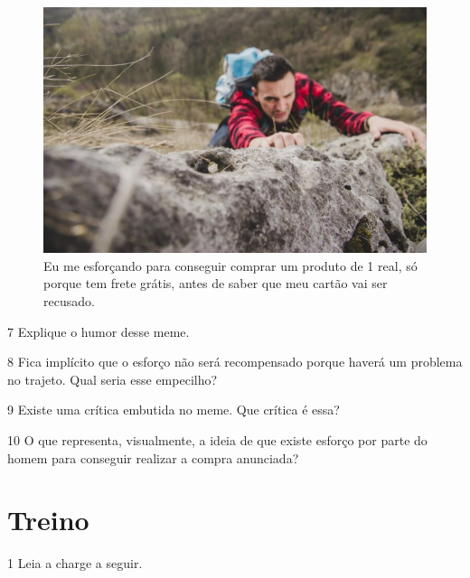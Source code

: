 \begin{figure}[htpb!]
\centering
\includegraphics[width=.8\textwidth]{./media/img5pt.png}
\caption{Eu me esforçando para conseguir comprar um produto de 1 real, só porque
tem frete grátis, antes de saber que meu cartão vai ser recusado.}
\end{figure}

\num{7} Explique o humor desse meme.


\num{8} Fica implícito que o esforço não será recompensado porque haverá um
  problema no trajeto. Qual seria esse empecilho?


\num{9} Existe uma crítica embutida no meme. Que crítica é essa?


\num{10} O que representa, visualmente, a ideia de que existe esforço por parte
  do homem para conseguir realizar a compra anunciada?


\section{Treino}

\num{1} Leia a charge a seguir.


